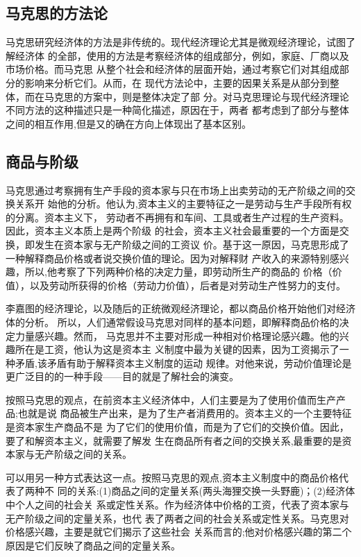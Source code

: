 \subsection{马克思的方法论}

马克思研究经济体的方法是非传统的。现代经济理论尤其是微观经济理论，试图了解经济体
的全部，使用的方法是考察经济体的组成部分，例如，家庭、厂商以及市场价格。而马克思
从整个社会和经济体的层面开始，通过考察它们对其组成部分的影响来分析它们。从而，在
现代方法论中，主要的因果关系是从部分到整体，而在马克思的方案中，则是整体决定了部
分。对马克思理论与现代经济理论不同方法的这种描述只是一种简化描述，原因在于，两者
都考虑到了部分与整体之间的相互作用,但是又的确在方向上体现出了基本区别。

\subsection{商品与阶级}

马克思通过考察拥有生产手段的资本家与只在市场上出卖劳动的无产阶级之间的交换关系开
始他的分析。他认为,资本主义的主要特征之一是劳动与生产手段所有权的分离。资本主义下，
劳动者不再拥有和车间、工具或者生产过程的生产资料。因此，资本主义本质上是两个阶级
的社会，资本主义社会最重要的一个方面是交换，即发生在资本家与无产阶级之间的工资议
价。基于这一原因，马克思形成了一种解释商品价格或者说交换价值的理论。因为对解释财
产收入的来源特别感兴趣，所以,他考察了下列两种价格的决定力量，即劳动所生产的商品的
价格（价值），以及劳动所获得的价格（劳动力价值），后者是对劳动生产性努力的支付。

李嘉图的经济理论，以及随后的正统微观经济理论，都以商品价格开始他们对经济体的分析。
所以，人们通常假设马克思对同样的基本问题，即解释商品价格的决定力量感兴趣。然而，
马克思并不主要对形成一种相对价格理论感兴趣。他的兴趣所在是工资，他认为这是资本主
义制度中最为关键的因素，因为工资揭示了一种矛盾,该矛盾有助于解释资本主义制度的运动
规律。对他来说，劳动价值理论是更广泛目的的一种手段——目的就是了解社会的演变。

按照马克思的观点，在前资本主义经济体中，人们主要是为了使用价值而生产产品;也就是说
商品被生产出来，是为了生产者消费用的。资本主义的一个主要特征是资本家生产商品不是
为了它们的使用价值，而是为了它们的交换价值。因此，要了和解资本主义，就需要了解发
生在商品所有者之间的交换关系,最重要的是资本家与无产阶级之间的关系。

可以用另一种方式表达这一点。按照马克思的观点,资本主义制度中的商品价格代表了两种不
同的关系:(1)商品之间的定量关系(两头海狸交换一头野鹿)；(2)经济体中个人之间的社会关
系或定性关系。作为经济体中价格的工资，代表了资本家与无产阶级之间的定量关系，也代
表了两者之间的社会关系或定性关系。马克思对价格感兴趣，主要是就它们揭示了这些社会
关系而言的;他对价格感兴趣的第二个原因是它们反映了商品之间的定量关系。

